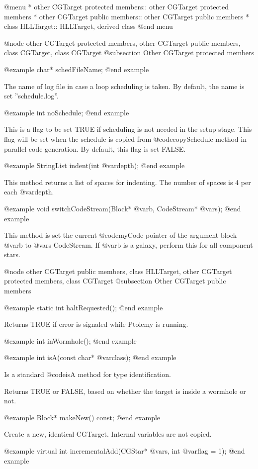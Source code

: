 @menu
* other CGTarget protected members::	other CGTarget protected members
* other CGTarget public members::	other CGTarget public members
* class HLLTarget::			HLLTarget, derived class
@end menu

@node other CGTarget protected members, other CGTarget public members, class CGTarget, class CGTarget
@subsection Other CGTarget protected members

@example
char* schedFileName;
@end example

The name of log file in case a loop scheduling is taken. By default, the name
is set ''schedule.log''.

@example
int noSchedule;
@end example

This is a flag to be set TRUE if scheduling is not needed in the setup stage.
This flag will be set when the schedule is copied from @code{copySchedule}
method in parallel code generation. By default, this flag is set FALSE.

@example
StringList indent(int @var{depth});
@end example

This method returns a list of spaces for indenting. The number of spaces
is 4 per each @var{depth}.

@example
void switchCodeStream(Block* @var{b}, CodeStream* @var{s});
@end example

This method is set the current @code{myCode} pointer of the argument block
@var{b} to @var{s} CodeStream. If @var{b} is a galaxy, perform this for
all component stars.

@node other CGTarget public members, class HLLTarget, other CGTarget protected members, class CGTarget
@subsection Other CGTarget public members

@example
static int haltRequested();
@end example

Returns TRUE if error is signaled while Ptolemy is running.

@example
int inWormhole();
@end example

@example
int isA(const char* @var{class});
@end example

Is a standard @code{isA} method for type identification.

Returns TRUE or FALSE, based on whether the target is inside a wormhole or not.

@example
Block* makeNew() const;
@end example

Create a new, identical CGTarget. Internal variables are not copied.

@example
virtual int incrementalAdd(CGStar* @var{s}, int @var{flag} = 1);
@end example

